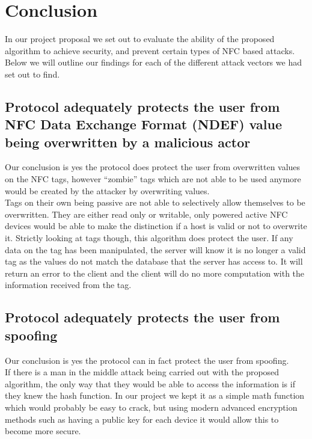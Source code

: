 \section{Conclusion}

In our project proposal we set out to evaluate the ability of the proposed algorithm to achieve security, and prevent certain types of NFC based attacks. Below we will outline our findings for each of the different attack vectors we had set out to find.
 
\subsection{Protocol adequately protects the user from NFC Data Exchange Format (NDEF) value being overwritten by a malicious actor}
 
Our conclusion is yes the protocol does protect the user from overwritten values on the NFC tags, however “zombie” tags which are not able to be used anymore would be created by the attacker by overwriting values.\\

Tags on their own being passive are not able to selectively allow themselves to be overwritten. They are either read only or writable, only powered active NFC devices would be able to make the distinction if a host is valid or not to overwrite it. Strictly looking at tags though, this algorithm does protect the user. If any data on the tag has been manipulated, the server will know it is no longer a valid tag as the values do not match the database that the server has access to. It will return an error to the client and the client will do no more computation with the information received from the tag.
 
\subsection{Protocol adequately protects the user from spoofing}
 
Our conclusion is yes the protocol can in fact protect the user from spoofing.\\

If there is a man in the middle attack being carried out with the proposed algorithm, the only way that they would be able to access the information is if they knew the hash function. In our project we kept it as a simple math function which would probably be easy to crack, but using modern advanced encryption methods such as having a public key for each device it would allow this to become more secure.\\
 
